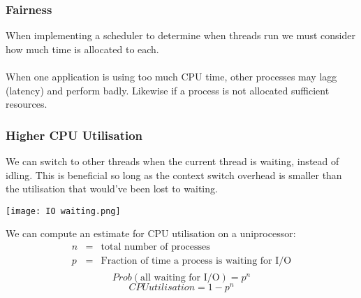 \documentclass{report}
\begin{document}
        \subsubsection*{Fairness}
            When implementing a scheduler to determine when threads run we must consider how much time is allocated to each.
            \\
            \\ When one application is using too much CPU time, other processes may lagg (latency) and perform badly. Likewise if a process is not allocated sufficient resources.
        \subsubsection*{Higher CPU Utilisation}
            We can switch to other threads when the current thread is waiting, instead of idling. This is beneficial so long as the context switch overhead is smaller than the utilisation that would've been lost to waiting.
            \begin{center}
                \texttt{[image: IO waiting.png]}
            \end{center}
            We can compute an estimate for CPU utilisation on a uniprocessor:
            \[\begin{matrix}
                n & = & \text{total number of processes} \\
                p & = & \text{Fraction of time a process is waiting for I/O} \\
            \end{matrix}\]
            \[Prob(\text{all waiting for I/O}) = p^n\]
            \[CPU utilisation = 1- p^n\]
\end{document}
